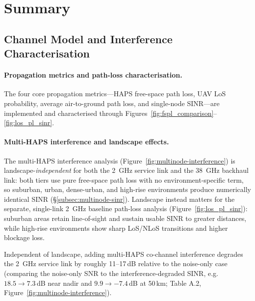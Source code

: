 \documentclass[conference]{IEEEtran}
\begin{document}
\section{Summary}

\subsection{Channel Model and Interference Characterisation}
\label{sec:channel-model-summary}

\paragraph{Propagation metrics and path-loss characterisation.}
The four core propagation metrics---HAPS free-space path loss, UAV LoS probability,
average air-to-ground path loss, and single-node SINR---are implemented and
characterised through Figures~\ref{fig:fspl_comparison}--\ref{fig:los_pl_sinr}.

\paragraph{Multi-HAPS interference and landscape effects.}
The multi-HAPS interference analysis (Figure~\ref{fig:multinode-interference}) is landscape-\emph{independent} for both the 2~GHz service link and the 38~GHz backhaul link: both tiers use pure free-space path loss with no environment-specific term, so suburban, urban, dense-urban, and high-rise environments produce numerically identical SINR (\S\ref{subsec:multinode-sinr}). Landscape instead matters for the separate, single-link 2~GHz baseline path-loss analysis (Figure~\ref{fig:los_pl_sinr}): suburban areas retain line-of-sight and sustain usable SINR to greater distances, while high-rise environments show sharp LoS/NLoS transitions and higher blockage loss.

Independent of landscape, adding multi-HAPS co-channel interference degrades the 2~GHz service link by roughly 11--17\,dB relative to the noise-only case (comparing the noise-only SNR to the interference-degraded SINR, e.g.\ $18.5\to7.3$\,dB near nadir and $9.9\to-7.4$\,dB at 50\,km; Table A.2, Figure~\ref{fig:multinode-interference}).
\end{document}
